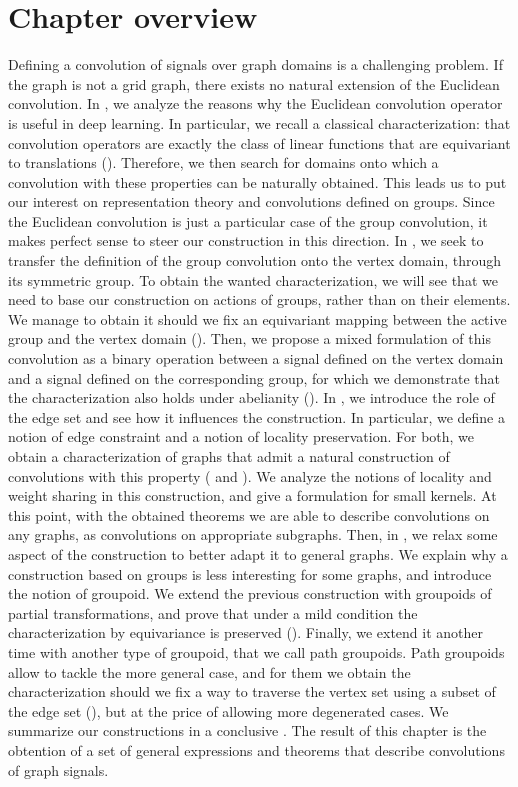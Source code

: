 \section*{Chapter overview}

Defining a convolution of signals over graph domains is a challenging problem. If the graph is not a grid graph, there exists no natural extension of the Euclidean convolution. In , we analyze the reasons why the Euclidean convolution operator is useful in deep learning. In particular, we recall a classical characterization: that convolution operators are exactly the class of linear functions that are equivariant to translations (). Therefore, we then search for domains onto which a convolution with these properties can be naturally obtained. This leads us to put our interest on representation theory and convolutions defined on groups. Since the Euclidean convolution is just a particular case of the group convolution, it makes perfect sense to steer our construction in this direction. In , we seek to transfer the definition of the group convolution onto the vertex domain, through its symmetric group. To obtain the wanted characterization, we will see that we need to base our construction on actions of groups, rather than on their elements. We manage to obtain it should we fix an equivariant mapping between the active group and the vertex domain (). Then, we propose a mixed formulation of this convolution as a binary operation between a signal defined on the vertex domain and a signal defined on the corresponding group, for which we demonstrate that the characterization also holds under abelianity (). In , we introduce the role of the edge set and see how it influences the construction. In particular, we define a notion of edge constraint and a notion of locality preservation. For both, we obtain a characterization of graphs that admit a natural construction of convolutions with this property ( and ). We analyze the notions of locality and weight sharing in this construction, and give a formulation for small kernels. At this point, with the obtained theorems we are able to describe convolutions on any graphs, as convolutions on appropriate subgraphs. Then, in , we relax some aspect of the construction to better adapt it to general graphs. We explain why a construction based on groups is less interesting for some graphs, and introduce the notion of groupoid. We extend the previous construction with groupoids of partial transformations, and prove that under a mild condition the characterization by equivariance is preserved (). Finally, we extend it another time with another type of groupoid, that we call path groupoids. Path groupoids allow to tackle the more general case, and for them we obtain the characterization should we fix a way to traverse the vertex set using a subset of the edge set (), but at the price of allowing more degenerated cases. We summarize our constructions in a conclusive . The result of this chapter is the obtention of a set of general expressions and theorems that describe convolutions of graph signals.